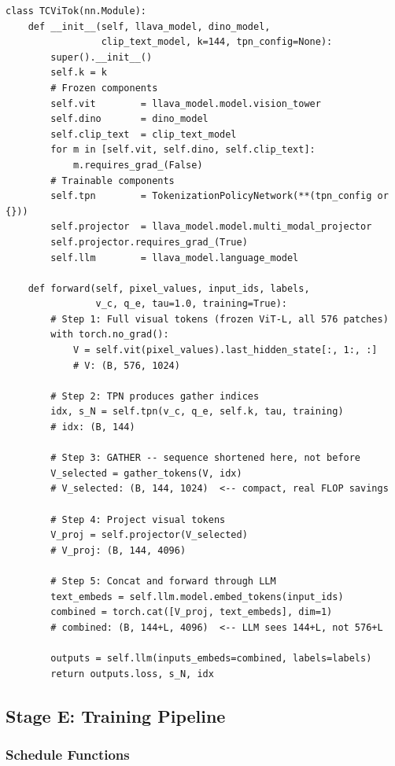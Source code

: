 \documentclass[11pt,a4paper]{article}
\begin{document}
\begin{lstlisting}[caption={TC-ViTok forward pass using gather (Option B).}]
class TCViTok(nn.Module):
    def __init__(self, llava_model, dino_model,
                 clip_text_model, k=144, tpn_config=None):
        super().__init__()
        self.k = k
        # Frozen components
        self.vit        = llava_model.model.vision_tower
        self.dino       = dino_model
        self.clip_text  = clip_text_model
        for m in [self.vit, self.dino, self.clip_text]:
            m.requires_grad_(False)
        # Trainable components
        self.tpn        = TokenizationPolicyNetwork(**(tpn_config or {}))
        self.projector  = llava_model.model.multi_modal_projector
        self.projector.requires_grad_(True)
        self.llm        = llava_model.language_model

    def forward(self, pixel_values, input_ids, labels,
                v_c, q_e, tau=1.0, training=True):
        # Step 1: Full visual tokens (frozen ViT-L, all 576 patches)
        with torch.no_grad():
            V = self.vit(pixel_values).last_hidden_state[:, 1:, :]
            # V: (B, 576, 1024)

        # Step 2: TPN produces gather indices
        idx, s_N = self.tpn(v_c, q_e, self.k, tau, training)
        # idx: (B, 144)

        # Step 3: GATHER -- sequence shortened here, not before
        V_selected = gather_tokens(V, idx)
        # V_selected: (B, 144, 1024)  <-- compact, real FLOP savings

        # Step 4: Project visual tokens
        V_proj = self.projector(V_selected)
        # V_proj: (B, 144, 4096)

        # Step 5: Concat and forward through LLM
        text_embeds = self.llm.model.embed_tokens(input_ids)
        combined = torch.cat([V_proj, text_embeds], dim=1)
        # combined: (B, 144+L, 4096)  <-- LLM sees 144+L, not 576+L

        outputs = self.llm(inputs_embeds=combined, labels=labels)
        return outputs.loss, s_N, idx
\end{lstlisting}

\subsection{Stage E: Training Pipeline}

\subsubsection{Schedule Functions}
\end{document}
